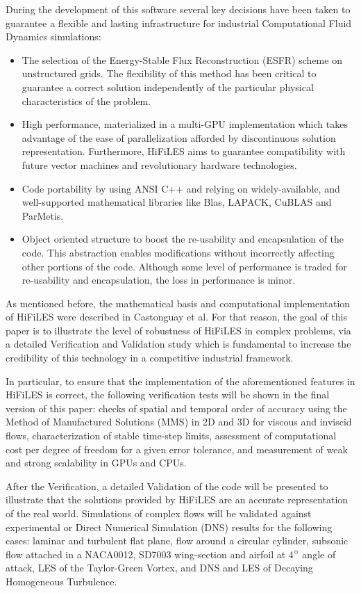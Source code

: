 During the development of this software several key decisions have been taken to guarantee a flexible and lasting infrastructure for industrial Computational Fluid Dynamics simulations:
\begin{itemize}
\item The selection of the Energy-Stable Flux Reconstruction (ESFR) scheme on unstructured grids. The flexibility of this method has been critical to guarantee a correct solution independently of the particular physical characteristics of the problem.
\item High performance, materialized in a multi-GPU implementation which takes advantage of the ease of parallelization afforded by discontinuous solution representation. Furthermore, HiFiLES aims to guarantee compatibility with future vector machines and revolutionary hardware technologies.
\item Code portability by using ANSI C++ and relying on widely-available, and well-supported mathematical libraries like Blas, LAPACK, CuBLAS and ParMetis.
\item Object oriented structure to boost the re-usability and encapsulation of the code. This abstraction enables modifications without incorrectly affecting other portions of the code. Although some level of performance is traded for re-usability and encapsulation, the loss in performance is minor.
\end{itemize}

As mentioned before, the mathematical basis and computational implementation of HiFiLES were described in Castonguay et al. For that reason, the goal of this paper is to illustrate the level of robustness of HiFiLES in complex problems, via a detailed Verification and Validation study which is fundamental to increase the credibility of this technology in a competitive industrial framework.

In particular, to ensure that the implementation of the aforementioned features in HiFiLES is correct, the following verification tests will be shown in the final version of this paper: checks of spatial and temporal order of accuracy using the Method of Manufactured Solutions (MMS) in 2D and 3D for viscous and inviscid flows, characterization of stable time-step limits, assessment of computational cost per degree of freedom for a given error tolerance, and measurement of weak and strong scalability in GPUs and CPUs. 

After the Verification, a detailed Validation of the code will be presented to illustrate that the solutions provided by HiFiLES are an accurate representation of the real world. Simulations of complex flows will be validated against experimental or Direct Numerical Simulation (DNS) results for the following cases: laminar and turbulent flat plane, flow around a circular cylinder, subsonic flow attached in a NACA0012, SD7003 wing-section and airfoil at 4$^{\circ}$ angle of attack, LES of the Taylor-Green Vortex, and DNS and LES of Decaying Homogeneous Turbulence.

